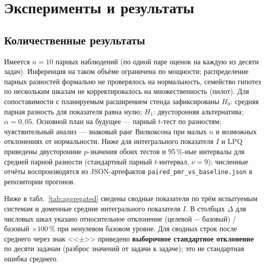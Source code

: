 \documentclass[a4paper,12pt]{article}
\begin{document}
\section{Эксперименты и результаты}

\subsection{Количественные результаты}

Имеется $n=10$ парных наблюдений (по одной паре оценок на каждую из десяти задач). Инференция на таком объёме ограничена по мощности; распределение парных разностей формально не проверялось на нормальность, семейство гипотез по нескольким шкалам не корректировалось на множественность (пилот). Для сопоставимости с планируемым расширением стенда зафиксированы $H_0$: средняя парная разность для показателя равна нулю; $H_1$: двусторонняя альтернатива; $\alpha=0{,}05$. Основной план на будущее --- парный $t$-тест по разностям; чувствительный анализ --- знаковый ранг Вилкоксона при малых $n$ и возможных отклонениях от нормальности. Ниже для интегрального показателя $I$ и LPQ приведены двусторонние $p$-значения обоих тестов и 95\,\%-ные интервалы для средней парной разности (стандартный парный $t$-интервал, $\nu=9$); численные отчёты воспроизводятся из JSON-артефактов \texttt{paired\_pmr\_vs\_baseline.json} в репозитории прогонов.

Ниже в табл.~\ref{tab:aggregated} сведены сводные показатели по трём испытуемым системам и доменные средние интегрального показателя $I$. В столбцах $\Delta$ для числовых шкал указано относительное отклонение (целевой $-$ базовый) / базовый $\times 100\,\%$ при ненулевом базовом уровне. Для сводных строк после среднего через знак <<$\pm$>> приведено \textbf{выборочное стандартное отклонение} по десяти задачам (разброс значений от задачи к задаче); это не стандартная ошибка среднего.
\end{document}
